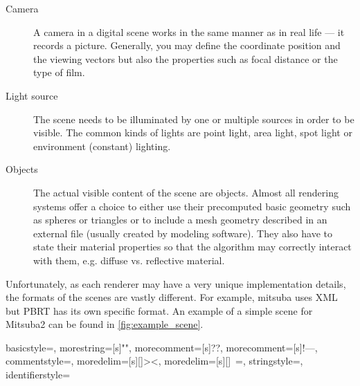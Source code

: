 \begin{description}
	\item[Camera] A camera in a digital scene works in the same manner as in real life --- it records a picture. Generally, you may define the coordinate position and the viewing vectors but also the properties such as focal distance or the type of film.
	\item[Light source] The scene needs to be illuminated by one or multiple sources in order to be visible. The common kinds of lights are point light, area light, spot light or environment (constant) lighting. 
	\item[Objects] The actual visible content of the scene are objects. Almost all rendering systems offer a choice to either use their precomputed basic geometry such as spheres or triangles or to include a mesh geometry described in an external file (usually created by modeling software). They also have to state their material properties so that the algorithm may correctly interact with them, e.g. diffuse vs. reflective material.
\end{description}

Unfortunately, as each renderer may have a very unique implementation details, the formats of the scenes are vastly different. For example, mitsuba uses XML but PBRT has its own specific format. An example of a simple scene for Mitsuba2 can be found in \ref{fig:example_scene}.

{
	basicstyle=\ttfamily,
	morestring=[s]{"}{"},
	morecomment=[s]{?}{?},
	morecomment=[s]{!--}{--},
	commentstyle=\color{darkgreen},
	moredelim=[s][\color{black}]{>}{<},
	moredelim=[s][\color{red}]{\ }{=},
	stringstyle=\color{blue},
	identifierstyle=\color{maroon}
}

